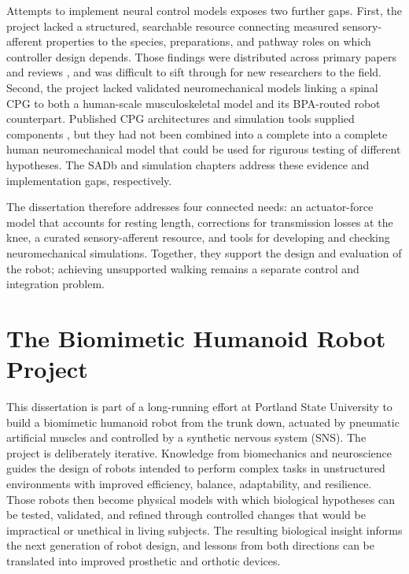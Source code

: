 Attempts to implement neural control models exposes two further gaps. First, the project lacked a structured, searchable resource connecting measured sensory-afferent properties to the species, preparations, and pathway roles on which controller design depends. Those findings were distributed across primary papers and reviews \citep{van_de_crommert_review_1998, windhorst_muscle_2007, windhorst_spinal_2022}, and was difficult to sift through for new researchers to the field. Second, the project lacked validated neuromechanical models linking a spinal CPG to both a human-scale musculoskeletal model and its BPA-routed robot counterpart. Published CPG architectures and simulation tools supplied components \citep{rybak_modelling_2006, mccrea_organization_2008, markin_afferent_2010, nourse_sns_2023}, but they had not been combined into a complete into a complete human neuromechanical model that could be used for rigurous testing of different hypotheses. The SADb and simulation chapters address these evidence and implementation gaps, respectively.

The dissertation therefore addresses four connected needs: an actuator-force model that accounts for resting length, corrections for transmission losses at the knee, a curated sensory-afferent resource, and tools for developing and checking neuromechanical simulations. Together, they support the design and evaluation of the robot; achieving unsupported walking remains a separate control and integration problem.

\section{The Biomimetic Humanoid Robot Project}\label{sec:project}

This dissertation is part of a long-running effort at Portland State University to build a biomimetic humanoid robot from the trunk down, actuated by pneumatic artificial muscles and controlled by a synthetic nervous system (SNS). The project is deliberately iterative. Knowledge from biomechanics and neuroscience guides the design of robots intended to perform complex tasks in unstructured environments with improved efficiency, balance, adaptability, and resilience. Those robots then become physical models with which biological hypotheses can be tested, validated, and refined through controlled changes that would be impractical or unethical in living subjects. The resulting biological insight informs the next generation of robot design, and lessons from both directions can be translated into improved prosthetic and orthotic devices.

